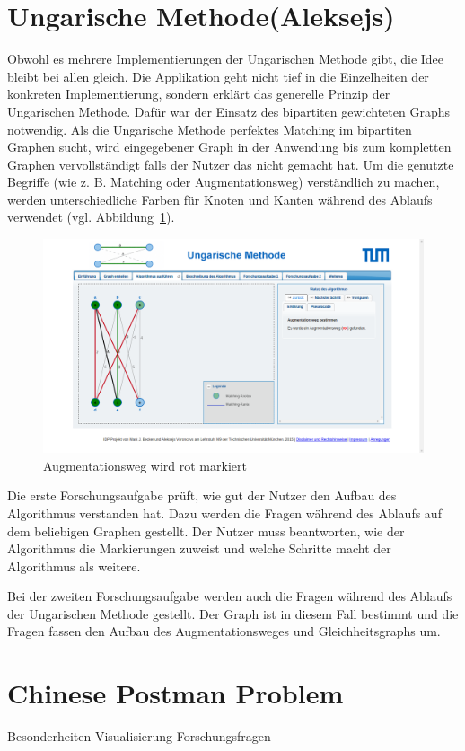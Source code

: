\section{Ungarische Methode(Aleksejs)}
Obwohl es mehrere Implementierungen der Ungarischen Methode gibt, die Idee bleibt bei allen gleich. Die Applikation geht nicht tief in die Einzelheiten der konkreten Implementierung, sondern erklärt das generelle Prinzip der Ungarischen Methode. Dafür war der Einsatz des bipartiten gewichteten Graphs notwendig. Als die Ungarische Methode perfektes Matching im bipartiten Graphen sucht, wird eingegebener Graph in der Anwendung bis zum kompletten Graphen vervollständigt falls der Nutzer das nicht gemacht hat. Um die genutzte Begriffe (wie z. B. Matching oder Augmentationsweg) verständlich zu machen, werden unterschiedliche Farben für Knoten und Kanten während des Ablaufs verwendet (vgl. Abbildung~\ref{fig:hungarian-colors}).
\begin{figure}[h!]
	\centering
	\includegraphics[width=\textwidth]{figures/hungarian-colors}
	\caption[Ungarische Methode]{Augmentationsweg wird rot markiert}\label{fig:hungarian-colors}
\end{figure}

Die erste Forschungsaufgabe prüft, wie gut der Nutzer den Aufbau des Algorithmus verstanden hat. Dazu werden die Fragen während des Ablaufs auf dem beliebigen Graphen gestellt. Der Nutzer muss beantworten, wie der Algorithmus die Markierungen zuweist und welche Schritte macht der Algorithmus als weitere. 

Bei der zweiten Forschungsaufgabe werden auch die Fragen während des Ablaufs der Ungarischen Methode gestellt. Der Graph ist in diesem Fall bestimmt und die Fragen fassen den Aufbau des Augmentationsweges und Gleichheitsgraphs um.

\section{Chinese Postman Problem}
Besonderheiten Visualisierung
Forschungsfragen

